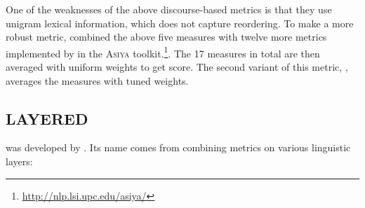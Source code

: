 One of the weaknesses of the above discourse-based metrics is that they use
unigram lexical information, which does not capture reordering. To make a more
robust metric,  combined the above five measures
with twelve more metrics implemented by  in the
\textsc{Asiya} toolkit.\footnote{\url{http://nlp.lsi.upc.edu/asiya/}}. The 17
measures in total are then averaged with uniform weights to get
 score. The second variant of this metric,
, averages the measures with tuned weights.

\subsection{LAYERED}

 was developed by . Its name
comes from combining metrics on various linguistic layers:

